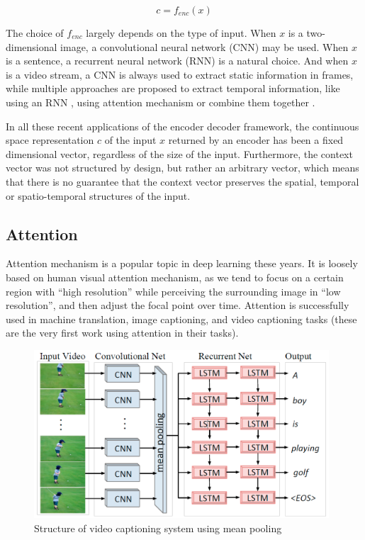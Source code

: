 \begin{equation}
c=f_{enc}(x)
\end{equation}

The choice of $f_{enc}$ largely depends on the type of input. When $x$ is a two-dimensional image, a convolutional neural network (CNN) may be used. When $x$ is a sentence, a recurrent neural network (RNN) is a natural choice. And when $x$ is a video stream, a CNN is always used to extract static information in frames, while multiple approaches are proposed to extract temporal information, like using an RNN \cite{venugopalan2015sequence}, using attention mechanism \cite{yao2015describing} or combine them together \cite{pan2015hierarchical}.

In all these recent applications of the encoder decoder framework, the continuous space representation $c$ of the input $x$ returned by an encoder has been a fixed dimensional vector, regardless of the size of the input. Furthermore, the context vector was not structured by design, but rather an arbitrary vector, which means that there is no guarantee that the context vector preserves the spatial, temporal or spatio-temporal structures of the input.

\subsection{Attention}
Attention mechanism is a popular topic in deep learning these years. It is loosely based on human visual attention mechanism, as we tend to focus on a certain region with “high resolution” while perceiving the surrounding image in “low resolution”, and then adjust the focal point over time. Attention is successfully used in machine translation\cite{bahdanau2014neural}, image captioning\cite{xu2015show}, and video captioning\cite{venugopalan2014translating} tasks (these are the very first work using attention in their tasks).

\begin{figure}[htbp]
\centering
\includegraphics[width=11cm]{resources/mp.png}
\caption{Structure of video captioning system using mean pooling \cite{venugopalan2014translating}}
\label{fig:mp}
\end{figure}

